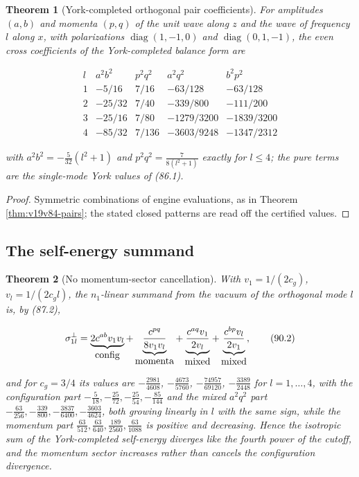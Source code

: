 \documentclass[11pt]{article}
\newtheorem{theorem}{Theorem}[section]
\theoremstyle{remark}
\begin{document}
\begin{theorem}[York-completed orthogonal pair coefficients]
\label{thm:v19v87-coefficients}
For amplitudes \((a,b)\) and momenta \((p,q)\) of the unit wave along
\(z\) and the wave of frequency \(l\) along \(x\), with polarizations
\(\operatorname{diag}(1,-1,0)\) and \(\operatorname{diag}(0,1,-1)\), the
even cross coefficients of the York-completed balance form are

\[
\begin{array}{c|c|c|c|c}
l&a^2b^2&p^2q^2&a^2q^2&b^2p^2\\ \hline
1&-5/16&7/16&-63/128&-63/128\\
2&-25/32&7/40&-339/800&-111/200\\
3&-25/16&7/80&-1279/3200&-1839/3200\\
4&-85/32&7/136&-3603/9248&-1347/2312
\end{array}                                                            \tag{90.1}
\]

with \(a^2b^2=-\tfrac5{32}(l^2+1)\) and \(p^2q^2=\tfrac{7}{8(l^2+1)}\)
exactly for \(l\leq4\); the pure terms are the single-mode York values
of (86.1).
\end{theorem}

\begin{proof}
Symmetric combinations of engine evaluations, as in Theorem
\ref{thm:v19v84-pairs}; the stated closed patterns are read off the
certified values.
\end{proof}

\subsection{The self-energy summand}

\begin{theorem}[No momentum-sector cancellation]
\label{thm:v19v87-no-cancel}
With \(v_1=1/(2c_g)\), \(v_l=1/(2c_gl)\), the \(n_1\)-linear summand
from the vacuum of the orthogonal mode \(l\) is, by (87.2),

\[
 \sigma^{\perp}_{1l}
 =\underbrace{2c^{ab}v_1v_l}_{\hbox{config}}
 +\underbrace{\frac{c^{pq}}{8v_1v_l}}_{\hbox{momenta}}
 +\underbrace{\frac{c^{aq}v_1}{2v_l}}_{\hbox{mixed}}
 +\underbrace{\frac{c^{bp}v_l}{2v_1}}_{\hbox{mixed}},                    \tag{90.2}
\]

and for \(c_g=3/4\) its values are
\(-\tfrac{2981}{4608}\), \(-\tfrac{4673}{5760}\), \(-\tfrac{74957}{69120}\), \(-\tfrac{3389}{2448}\)
for \(l=1,\dots,4\), with the configuration part
\(-\tfrac5{18},-\tfrac{25}{72},-\tfrac{25}{54},-\tfrac{85}{144}\) and the
mixed \(a^2q^2\) part \(-\tfrac{63}{256},-\tfrac{339}{800},-\tfrac{3837}{6400},-\tfrac{3603}{4624}\),
both growing linearly in \(l\) with the same sign, while the momentum
part \(\tfrac{63}{512},\tfrac{63}{640},\tfrac{189}{2560},\tfrac{63}{1088}\)
is positive and decreasing.  Hence the isotropic sum of the
York-completed self-energy diverges like the fourth power of the
cutoff, and the momentum sector increases rather than cancels the
configuration divergence.
\end{theorem}
\end{document}
